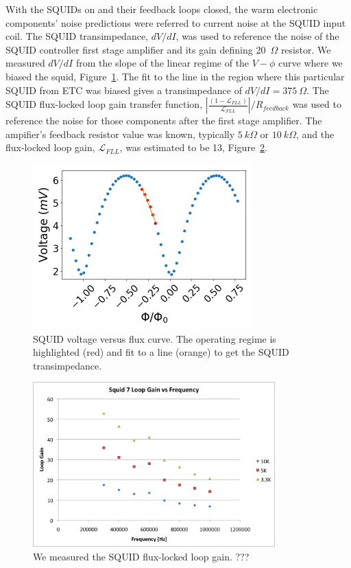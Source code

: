 With the \ac{SQUID}s on and their feedback loops closed, the warm electronic components' noise predictions were referred to current noise at the \ac{SQUID} input coil.
The \ac{SQUID} transimpedance, $dV/dI$, was used to reference the noise of the \ac{SQUID} controller first stage amplifier and its gain defining 20~$\Omega$ resistor. 
We measured $dV/dI$ from the slope of the linear regime of the $V-\phi$ curve where we biased the squid, Figure~\ref{fig:squid_transimpedance}. 
The fit to the line in the region where this particular \ac{SQUID} from \ac{ETC} was biased gives a transimpedance of $dV/dI=375~\Omega$. 
The \ac{SQUID} flux-locked loop gain transfer function, $|\frac{(1-\mathscr{L}_{FLL})}{\mathscr{L}_{FLL}}|/R_{feedback}$ was used to reference the noise for those components after the first stage amplifier. 
The ampifier's feedback resistor value was known, typically $5~k\Omega$ or $10~k\Omega$, and the flux-locked loop gain, $\mathscr{L}_{FLL}$, was estimated to be 13, Figure~\ref{fig:squid_flux_locked_loopgain}. 

\begin{figure}[ht!]
\begin{center}
\includegraphics[height=2.5in]{figures/vphi_physical.png}
\caption{\ac{SQUID} voltage versus flux curve. The operating regime is highlighted (red) and fit to a line (orange) to get the \ac{SQUID} transimpedance.
\label{fig:squid_transimpedance} }
\end{center}
\end{figure}

\begin{figure}[ht!]
\begin{center}
\includegraphics[height=2.5in]{figures/squid7_loopgain.png}
\caption{We measured the \ac{SQUID} flux-locked loop gain. ???
\label{fig:squid_flux_locked_loopgain} }
\end{center}
\end{figure}


